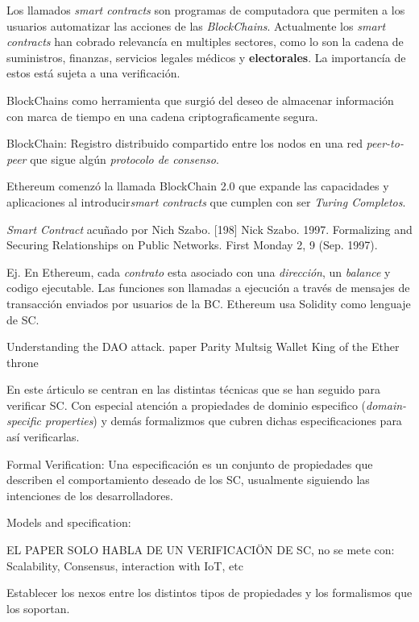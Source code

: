 Los llamados {\it smart contracts} son programas de computadora
que permiten a los usuarios automatizar las acciones de las 
{\it BlockChains}. Actualmente los {\it smart contracts}
han cobrado relevancía en multiples sectores, como lo son
la cadena de suministros, finanzas, servicios legales médicos
y {\bf electorales}. La importancía de estos está sujeta a
una verificación.


BlockChains como herramienta que surgió del deseo de
almacenar información con marca de tiempo en
una cadena criptograficamente segura.

BlockChain: Registro distribuido compartido entre
los nodos en una red {\it peer-to-peer} que sigue
algún {\it protocolo de consenso}.

Ethereum comenzó la llamada BlockChain 2.0
que expande las capacidades y aplicaciones
al introducir{\it smart contracts} que cumplen
con ser {\it Turing Completos}.

{\it Smart Contract} acuñado por Nich Szabo.
[198] Nick Szabo. 1997. Formalizing and Securing
Relationships on Public Networks. First Monday 2, 9 (Sep. 1997).

Ej. En Ethereum, cada {\it contrato} esta asociado
con una {\it dirección}, un {\it balance} y
codigo ejecutable.  Las funciones son llamadas
a ejecución a través de mensajes de transacción enviados
por usuarios de la BC. Ethereum usa Solidity como lenguaje de SC.



Understanding the DAO attack. paper
Parity Multsig Wallet
King of the Ether throne 


En este árticulo se centran en las distintas
técnicas que se han seguido para verificar
SC. Con especial atención a propiedades
de dominio especifico ({\it domain-specific properties})
y demás formalizmos que cubren dichas especificaciones
para así verificarlas.


Formal Verification: Una especificación es un conjunto de propiedades
que describen el comportamiento deseado de los SC,
usualmente siguiendo las intenciones de los desarrolladores. 

Models and specification:

EL PAPER SOLO HABLA DE UN VERIFICACIÖN DE SC, no se mete con:
Scalability, Consensus, interaction with IoT, etc

Establecer los nexos entre los distintos
tipos de propiedades y los formalismos
que los soportan.

